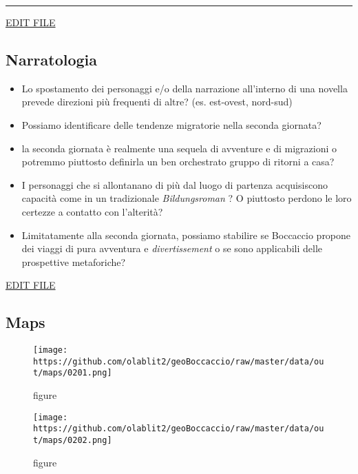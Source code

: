 \begin{center}\rule{0.5\linewidth}{\linethickness}\end{center}

\href{https://github.com/olablit2/geoBoccaccio/edit/master/docs/2018-article/40-chapter3.md}{EDIT
FILE}

\subsection{Narratologia}\label{narratologia}

\begin{itemize}
\tightlist
\item
  Lo spostamento dei personaggi e/o della narrazione all'interno di una
  novella prevede direzioni più frequenti di altre? (es. est-ovest,
  nord-sud)
\item
  Possiamo identificare delle tendenze migratorie nella seconda
  giornata?
\item
  la seconda giornata è realmente una sequela di avventure e di
  migrazioni o potremmo piuttosto definirla un ben orchestrato gruppo di
  ritorni a casa?
\item
  I personaggi che si allontanano di più dal luogo di partenza
  acquisiscono capacità come in un tradizionale \emph{Bildungsroman} ? O
  piuttosto perdono le loro certezze a contatto con l'alterità?
\item
  Limitatamente alla seconda giornata, possiamo stabilire se Boccaccio
  propone dei viaggi di pura avventura e \emph{divertissement} o se sono
  applicabili delle prospettive metaforiche?
\end{itemize}

\href{https://github.com/olablit2/geoBoccaccio/edit/master/docs/2018-article/90-conclusion.md}{EDIT
FILE}

\subsection{Maps}\label{maps}

\begin{figure}
\centering
\texttt{[image: https://github.com/olablit2/geoBoccaccio/raw/master/data/out/maps/0201.png]}
\caption{figure}
\end{figure}

\begin{figure}
\centering
\texttt{[image: https://github.com/olablit2/geoBoccaccio/raw/master/data/out/maps/0202.png]}
\caption{figure}
\end{figure}

